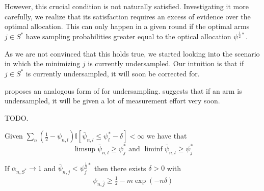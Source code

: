 However, this crucial condition is not naturally satisfied. Investigating it
more carefully, we realize that its satisfaction requires an excess of evidence
over the optimal allocation. This can only happen in a given round if the
optimal arms $j \in S^*$ have sampling probabilities greater equal to the
optical allocation $\psi^{\frac{1}{2}*}$.

As we are not convinced that this holds true, we started looking into the
scenario in which the minimizing $j$ is currently undersampled. Our intuition is
that if $j \in S^*$ is currently undersampled, it will soon be corrected
for.

 proposes an analogous form of
 for undersampling.
 suggests that if an arm is undersampled, it will
be given a lot of measurement effort very soon.
\begin{lemma}\label{lemma:if_converged_then_converged}
  TODO.
\end{lemma}
\begin{lemma}\label{lemma:limsup_undersampling}
  Given $\sum_n(\frac{1}{2} - \psi_{n, l}) \mathbb{I}[\bar{\psi}_{n, l} \leq
    \psi_l^* - \delta] < \infty$ we have that
  \[\limsup \bar{\psi}_{n, l} \geq \psi_j^* \text{ and } \liminf \bar{\psi}_{n,
      l} \geq \psi_j^*\]
\end{lemma}
\begin{lemma}\label{lemma:psi_undersampled}
  If $\alpha_{n, S^*} \rightarrow 1$ and $\bar{\psi}_{n, j} < \psi^{\frac{1}{2}*}_j$ then there exists $\delta > 0$
  with
  \begin{align}
    \psi_{n, \hat{j}} \geq \frac{1}{2} - m\exp(-n \delta)
  \end{align}
\end{lemma}

